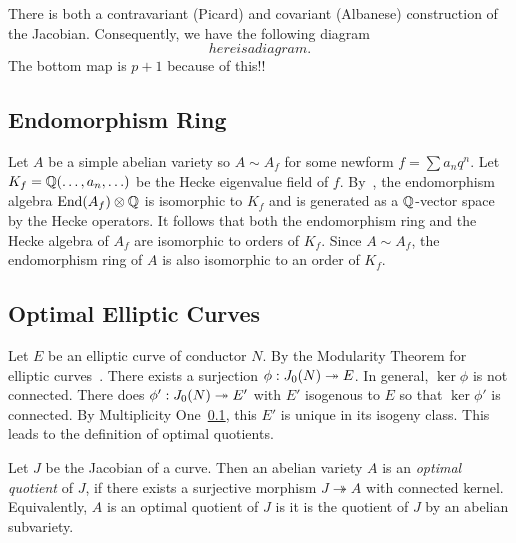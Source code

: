 \documentclass[11pt, proquest]{uwthesis}
\begin{document}
There is both a contravariant (Picard) and covariant (Albanese) construction of
the Jacobian. Consequently, we have the following diagram
\[
    here is a diagram.
\]
The bottom map is $p+1$ because of this!! %



\subsection{Endomorphism Ring}

Let $A$ be a simple abelian variety so $A\sim A_f$ for some newform $f=\sum
a_n q^n$. Let $K_f=\mathbb{Q}(\ldots,a_n,\ldots)$ be the Hecke eigenvalue field of
$f$. By~\cite[Prop. 7.14]{shimura:intro}, the endomorphism algebra
$\operatorname{End}(A_f)\otimes \mathbb{Q}$ is isomorphic to $K_f$ and is generated as a
$\mathbb{Q}$-vector space by the Hecke operators. It follows that both the
endomorphism ring and the Hecke algebra of $A_f$ are isomorphic to orders of
$K_f$. Since $A\sim A_f$, the endomorphism ring of $A$ is also isomorphic to an
order of $K_f$.


\subsection{Optimal Elliptic Curves}%
\label{sub:optimal_elliptic_curves}

Let $E$ be an elliptic curve of conductor $N$. By the Modularity Theorem for
elliptic curves~\cite{breuil-conrad-diamond-taylor}. There exists a surjection
$\phi:J_0(N)\twoheadrightarrow E$. In general, $\ker\phi$ is not connected. There does
$\phi':J_0(N)\twoheadrightarrow E'$ with $E'$ isogenous to $E$ so that $\ker\phi'$ is
connected. By Multiplicity One~\ref{}, this $E'$ is unique in its isogeny
class. This leads to the definition of optimal quotients.

\begin{definition}%
    \label{defn:optimal_quotient}
    Let $J$ be the Jacobian of a curve. Then an abelian variety $A$ is an
    \emph{optimal quotient} of $J$, if there exists a surjective morphism $J
    \twoheadrightarrow A$ with connected kernel. Equivalently, $A$ is an
    optimal quotient of $J$ is it is the quotient of $J$ by an abelian
    subvariety.
\end{definition}
\end{document}
